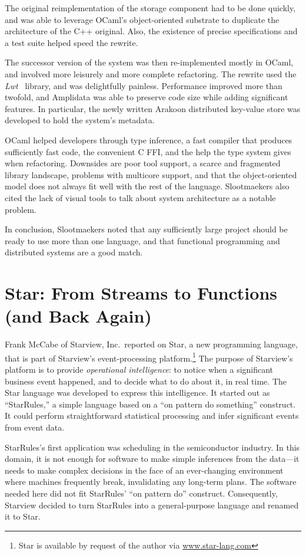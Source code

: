 \documentclass{jfp1}
\begin{document}
The original reimplementation of the storage component had to be done
quickly, and was able to leverage OCaml's object-oriented substrate to
duplicate the architecture of the C++ original.  Also, the existence
of precise specifications and a test suite helped speed the rewrite.

The successor version of the system was then re-implemented mostly in
OCaml, and involved more leisurely and more complete refactoring.  The
rewrite used the \textit{Lwt}~\cite{Vouillon:2008:LCT:1411304.1411307}
library, and was delightfully painless.  Performance improved more
than twofold, and Amplidata was able to preserve code size while
adding significant features.  In particular, the newly written Arakoon
distributed key-value store was developed to hold the system's metadata.

OCaml helped developers through type inference, a fast compiler that
produces sufficiently fast code, the convenient C FFI, and the help
the type system gives when refactoring.  Downsides are poor tool
support, a scarce and fragmented library landscape, problems with
multicore support, and that the object-oriented model does not always fit
well with the rest of the language.  Slootmaekers also cited the lack
of visual tools to talk about system architecture as a notable
problem.

In conclusion, Slootmaekers noted that any sufficiently large project
should be ready to use more than one language, and that functional
programming and distributed systems are a good match.

\section{Star: From Streams to Functions (and Back Again)}

Frank McCabe of Starview, Inc.\ reported on Star, a new programming
language, that is part of Starview's event-processing platform.\footnote{Star
is available by request of the author via \url{www.star-lang.com}}  The
purpose of Starview's platform is to provide \textit{operational
  intelligence}: to notice when a significant business event happened,
and to decide what to do about it, in real time.  The Star language
was developed to express this intelligence.  It started out as
``StarRules,'' a simple language based on a ``on pattern do
something'' construct.  It could perform straightforward statistical
processing and infer significant events from event data.

StarRules's first application was scheduling in the semiconductor
industry.  In this domain, it is not enough for software to make
simple inferences from the data---it needs to make complex decisions in
the face of an ever-changing environment where machines frequently
break, invalidating any long-term plans.  The software needed here did
not fit StarRules' ``on pattern do'' construct.  Consequently,
Starview decided to turn StarRules into a general-purpose language
and renamed it to Star.
\end{document}
